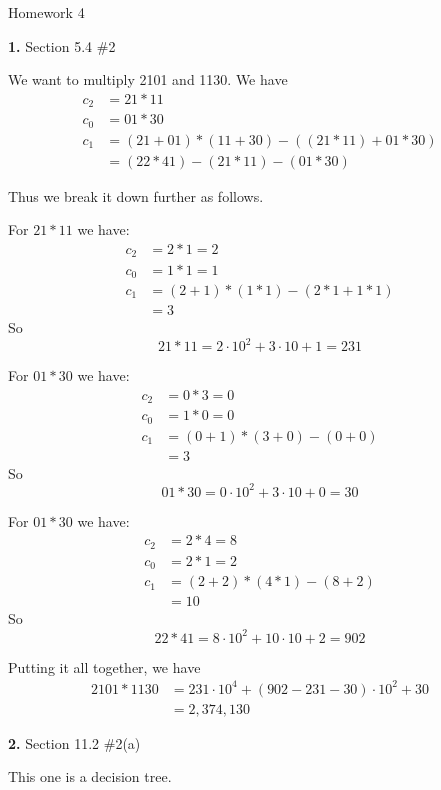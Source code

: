 \documentclass[letterpaper, 11pt]{article}
\newcommand{\hwnumbersec}[3]{\medskip \noindent\textbf{#1.} Section #2 \##3 \smallskip}
\begin{document}
\begin{center}
	{\LARGE Homework 4}\\
\end{center}

\hwnumbersec{1}{5.4}{2}

We want to multiply 2101 and 1130. We have 
\begin{align*}
  c_2 &= 21 * 11 \\
  c_0 &= 01 * 30 \\
  c_1 &= (21 + 01) * (11 + 30) - ((21 * 11) + 01 * 30)\\
      &= (22 * 41) - (21 * 11) - (01 * 30)
\end{align*}

Thus we break it down further as follows.

For \(21 * 11\) we have:
\begin{align*}
  c_2 &= 2 * 1 = 2 \\
  c_0 &= 1 * 1 = 1 \\
  c_1 &= (2 + 1) * (1 * 1) - (2 * 1 + 1 * 1)\\
      &= 3
\end{align*}
So 
\[21 * 11 = 2 \cdot 10^2 + 3\cdot 10 + 1 = 231\]

For \(01 * 30\) we have:
\begin{align*}
  c_2 &= 0 * 3 = 0 \\ 
  c_0 &= 1 * 0 = 0 \\
  c_1 &=  (0 + 1) * (3 + 0) - (0 + 0) \\
      &= 3
\end{align*}
So
\[01 * 30 = 0\cdot 10^2 + 3 \cdot 10 + 0 = 30\]

For \(01 * 30\) we have:
\begin{align*}
  c_2 &= 2 * 4 = 8 \\
  c_0 &= 2 * 1 = 2 \\
  c_1 &= (2 + 2) * (4 * 1) - (8 + 2)\\
      &= 10
\end{align*}
So 
\[22 * 41 = 8 \cdot 10^2 + 10 \cdot 10 + 2 = 902\]

Putting it all together, we have
\begin{align*}
  2101 * 1130 &= 231 \cdot 10^4 + (902 - 231 - 30) \cdot 10^2 + 30\\
              &= 2,374,130
\end{align*}

\hwnumbersec{2}{11.2}{2(a)}

This one is a decision tree.
\end{document}
